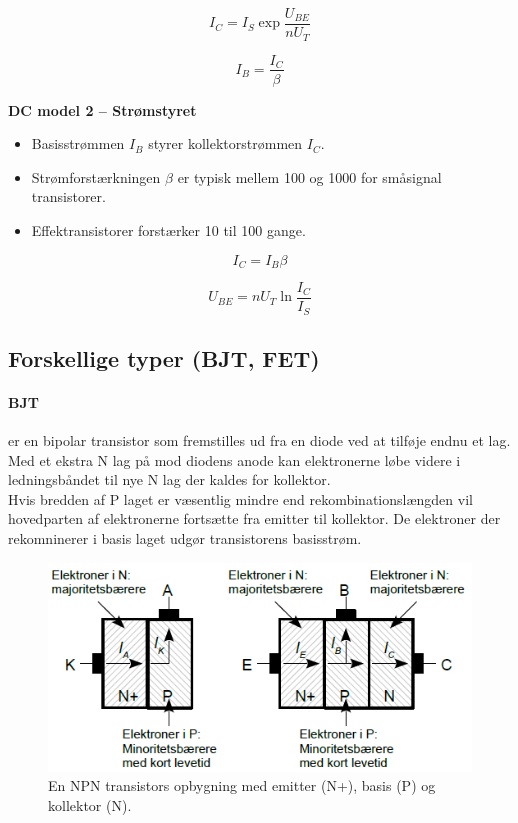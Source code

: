 \documentclass[danish]{article}
\begin{document}
\begin{equation}
I_C = I_S \exp \dfrac{U_{BE}}{n U_T}
\end{equation}

\begin{equation}
I_B = \dfrac{I_C}{\beta}
\end{equation}

\textbf{DC model 2 – Strømstyret}
\begin{itemize}
	\item Basisstrømmen $I_B$ styrer kollektorstrømmen $I_C$.
	\item Strømforstærkningen ${\beta}$ er typisk mellem 100 og 1000 for småsignal transistorer.
	\item Effektransistorer forstærker 10 til 100 gange.
\end{itemize}
 
\begin{equation}
I_C = I_B {\beta}
\end{equation}

\begin{equation}
U_{BE} = n U_T \ln \dfrac{I_C}{I_S}
\end{equation}

\subsection{Forskellige typer (BJT, FET)}

\paragraph{BJT} er en bipolar transistor som fremstilles ud fra en diode ved at tilføje endnu et lag. 
Med et ekstra N lag på mod diodens anode kan elektronerne løbe videre i ledningsbåndet til nye N lag der kaldes for kollektor.\\
 
Hvis bredden af P laget er væsentlig mindre end rekombinationslængden vil hovedparten af elektronerne fortsætte fra emitter til kollektor.
De elektroner der rekomninerer i basis laget udgør transistorens basisstrøm. 

\begin{figure} [H]
	\centering
	\includegraphics[width=0.95\linewidth]{graphics/bjt}
	\caption{En NPN transistors opbygning med emitter (N+), basis (P) og kollektor (N).}
	\label{fig:bjt}
\end{figure}
\end{document}
